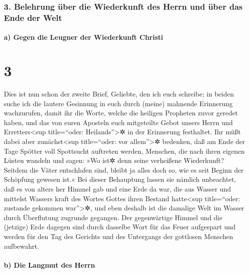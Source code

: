 \hypertarget{belehrung-uxfcber-die-wiederkunft-des-herrn-und-uxfcber-das-ende-der-welt}{%
\subsubsection{3. Belehrung über die Wiederkunft des Herrn und über das
Ende der
Welt}\label{belehrung-uxfcber-die-wiederkunft-des-herrn-und-uxfcber-das-ende-der-welt}}

\hypertarget{a-gegen-die-leugner-der-wiederkunft-christi}{%
\paragraph{a) Gegen die Leugner der Wiederkunft
Christi}\label{a-gegen-die-leugner-der-wiederkunft-christi}}

\hypertarget{section-1}{%
\section{3}\label{section-1}}

 Dies ist nun schon der zweite Brief, Geliebte, den ich
euch schreibe; in beiden suche ich die lautere Gesinnung in euch durch
(meine) mahnende Erinnerung wachzurufen,  damit ihr die
Worte, welche die heiligen Propheten zuvor geredet haben, und das von
euren Aposteln euch mitgeteilte Gebot unsers Herrn und
Erretters\textless sup title=``oder: Heilands''\textgreater✲ in der
Erinnerung festhaltet.  Ihr müßt dabei aber
zunächst\textless sup title=``oder: vor allem''\textgreater✲ bedenken,
daß am Ende der Tage Spötter voll Spottsucht auftreten werden, Menschen,
die nach ihren eigenen Lüsten wandeln  und sagen: »Wo ist✲
denn seine verheißene Wiederkunft? Seitdem die Väter entschlafen sind,
bleibt ja alles doch so, wie es seit Beginn der Schöpfung gewesen ist.«
 Bei dieser Behauptung lassen sie nämlich unbeachtet, daß
es von alters her Himmel gab und eine Erde da war, die aus Wasser und
mittelst Wassers kraft des Wortes Gottes ihren Bestand
hatte\textless sup title=``oder: zustande gekommen war''\textgreater✲,
 und eben deshalb ist die damalige Welt im Wasser durch
Überflutung zugrunde gegangen.  Der gegenwärtige Himmel
und die (jetzige) Erde dagegen sind durch dasselbe Wort für das Feuer
aufgespart und werden für den Tag des Gerichts und des Untergangs der
gottlosen Menschen aufbewahrt.

\hypertarget{b-die-langmut-des-herrn}{%
\paragraph{b) Die Langmut des Herrn}\label{b-die-langmut-des-herrn}}

